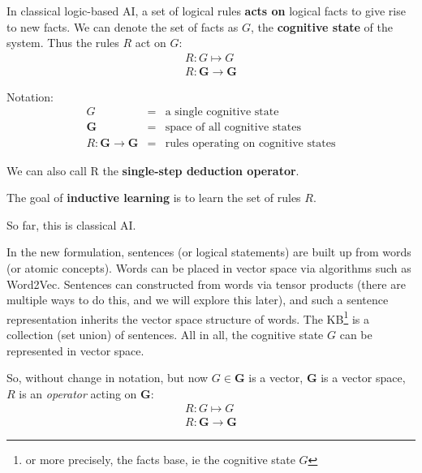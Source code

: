 \documentclass[12pt]{article}
\begin{document}

In classical logic-based AI, a set of logical rules \textbf{acts on} logical facts to give rise to new facts.  We can denote the set of facts as $G$, the \textbf{cognitive state} of the system.  Thus the rules $R$ act on $G$:
\begin{eqnarray}
 R: G \mapsto G \nonumber \\
 R : \mathbf{G} \rightarrow \mathbf{G} \nonumber
\end{eqnarray}

Notation:
\begin{eqnarray}
G &=& \mbox{a single cognitive state} \nonumber \\
\mathbf{G} &=& \mbox{space of all cognitive states} \nonumber \\
R : \mathbf{G} \rightarrow \mathbf{G} &=& \mbox{rules operating on cognitive states} \nonumber
\end{eqnarray}

We can also call R the \textbf{single-step deduction operator}.

The goal of \textbf{inductive learning} is to learn the set of rules $R$.

So far, this is classical AI.

In the new formulation, sentences (or logical statements) are built up from words (or atomic concepts).  Words can be placed in vector space via algorithms such as Word2Vec.  Sentences can constructed from words via tensor products (there are multiple ways to do this, and we will explore this later), and such a sentence representation inherits the vector space structure of words.  The KB\footnote{or more precisely, the facts base, ie the cognitive state $G$} is a collection (set union) of sentences.  All in all, the cognitive state $G$ can be represented in vector space.

So, without change in notation, but now $G \in \mathbf{G}$ is a vector, $\mathbf{G}$ is a vector space, $R$ is an \textit{operator} acting on $\mathbf{G}$:
\begin{eqnarray}
 R: G \mapsto G \nonumber \\
 R : \mathbf{G} \rightarrow \mathbf{G} \nonumber
\end{eqnarray}
\end{document}
